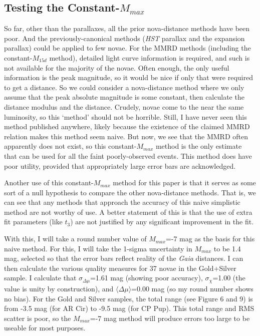 \documentclass[a4paper,fleqn,usenatbib]{mnras}
\begin{document}
\subsection{Testing  the Constant-$M_{max}$}

So far, other than the parallaxes, all the prior nova-distance methods have been poor.  And the previously-canonical methods ({\it HST} parallax and the expansion parallax) could be applied to few novae.  For the MMRD methods (including the constant-$M_{15d}$ method), detailed light curve information is required, and such is not available for the majority of the novae.  Often enough, the only useful information is the peak magnitude, so it would be nice if only that were required to get a distance.  So we could consider a nova-distance method where we only assume that the peak absolute magnitude is some constant, then calculate the distance modulus and the distance.  Crudely, novae come to the near the same luminosity, so this `method' should not be horrible.  Still, I have never seen this method published anywhere, likely because the existence of the claimed MMRD relation makes this method seem naive.  But now, we see that the MMRD often apparently does not exist, so this constant-$M_{max}$ method is the only estimate that can be used for all the faint poorly-observed events.  This method does have poor utility, provided that appropriately large error bars are acknowledged.

Another use of this constant-$M_{max}$ method for this paper is that it serves as some sort of a null hypothesis to compare the other nova-distance methods.  That is, we can see that any methods that approach the accuracy of this naive simplistic method are not worthy of use.  A better statement of this is that the use of extra fit parameters (like $t_3$) are not justified by any significant improvement in the fit.

With this, I will take a round number value of $M_{max}$=-7 mag as the basis for this naive method.  For this, I will take the 1-sigma uncertainty in $M_{max}$ to be 1.4 mag, selected so that the error bars reflect reality of the {\it Gaia} distances.  I can then calculate the various quality measures for 37 novae in the Gold+Silver sample.  I calculate that $\sigma_{\Delta \mu}$=1.61 mag (showing poor accuracy), $\sigma_{\chi}$=1.00 (the value is unity by construction), and $\langle \Delta \mu \rangle$=0.00 mag (so my round number shows no bias).  For the Gold and Silver samples, the total range (see Figure 6 and 9) is from -3.5 mag (for AR Cir) to -9.5 mag (for CP Pup).  This total range and RMS scatter is poor, so the $M_{max}$=-7 mag method will produce errors too large to be useable for most purposes.  
\end{document}

